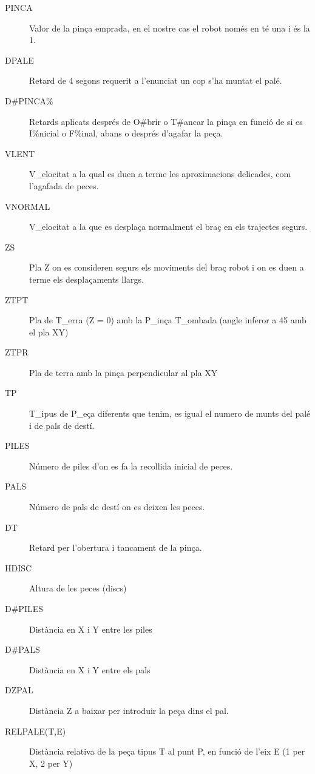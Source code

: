 \begin{description}\label{macprop}
\item [PINCA] Valor de la pinça emprada, en el nostre cas el robot només en té
una i és la 1.

\item [DPALE] Retard de 4 segons requerit a l'enunciat un cop s'ha muntat el
palé.

\item [D\#PINCA\%] Retards aplicats després de O\#brir o T\#ancar la pinça en
funció de si es I\%nicial o F\%inal, abans o després d'agafar la peça.

\item [VLENT] V\_elocitat a la qual es duen a terme les aproximacions
delicades, com l'agafada de peces.

\item [VNORMAL] V\_elocitat a la que es desplaça normalment el braç en els
trajectes segurs.

\item [ZS] Pla Z on es consideren segurs els moviments del braç robot i on
es duen a terme els desplaçaments llargs.

\item [ZTPT] Pla de T\_erra (Z = 0) amb la P\_inça T\_ombada (angle inferor
a 45 amb el pla XY)

\item [ZTPR] Pla de terra amb la pinça perpendicular al pla XY  
                                                                                                         
\item [TP] T\_ipus de P\_eça diferents que tenim, es igual el numero de munts
del palé i de pals de destí.

\item [PILES] Número de piles d'on es fa la recollida inicial de peces.

\item [PALS] Número de pals de destí on es deixen les peces.

\item [DT] Retard per l'obertura i tancament de la pinça.

\item [HDISC] Altura de les peces (discs)

\item [D\#PILES] Distància en X i Y entre les piles

\item [D\#PALS] Distància en X i Y entre els pals

\item [DZPAL] Distància Z a baixar per introduir la peça dins el pal.

\item [RELPALE(T,E)] Distància relativa de la peça tipus T al punt P, en funció
de l'eix E (1 per X, 2 per Y)
\end{description}

